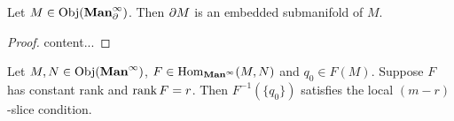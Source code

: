 \documentclass{book}
\begin{document}
	\begin{ex}
	 Let $M \in \operatorname{Obj}(\operatorname*{\text{\textbf{Man}}^{\infty}_{\partial}})$. Then $\partial M$ is an embedded submanifold of $M$.  
	\end{ex}	

	\begin{proof}
		content...
	\end{proof}

	\begin{ex}
		Let $M, N \in \operatorname{Obj}(\operatorname*{\text{\textbf{Man}}^{\infty}})$, $F \in \operatorname{Hom}_{\operatorname*{\text{\textbf{Man}}^{\infty}}}(M,N)$ and $q_0 \in F(M)$. Suppose $F$ has constant rank and $\operatorname{\text{rank}} F = r$. Then $F^{-1}(\{q_0\})$ satisfies the local $(m-r)$-slice condition. 
	\end{ex}
\end{document}
